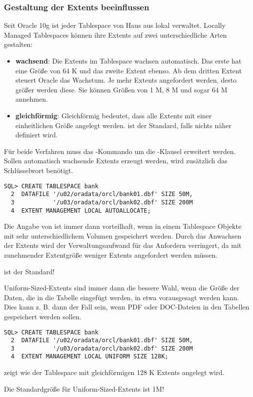         \subsubsection{Gestaltung der Extents beeinflussen}
          Seit Oracle 10g ist jeder Tablespace von Haus aus lokal verwaltet. Locally Managed Tablespaces können ihre Extents auf zwei unterschiedliche Arten gestalten:
          \begin{itemize}
            \item \textbf{wachsend}: Die Extents im Tablespace wachsen automatisch. Das erste hat eine Größe von 64 K und das zweite Extent ebenso. Ab dem dritten Extent steuert Oracle das Wachstum. Je mehr Extents angefordert werden, desto größer werden diese. Sie können Größen von 1 M, 8 M und sogar 64 M annehmen.
            \item \textbf{gleichförmig}: Gleichförmig bedeutet, dass alle Extents mit einer einheitlichen Größe angelegt werden.  ist der Standard, falls nichts näher definiert wird.
          \end{itemize}
          Für beide Verfahren muss das -Kommando um die -Klausel erweitert werden. Sollen automatisch wachsende Extents erzeugt werden, wird zusätzlich das Schlüsselwort  benötigt.
          \begin{lstlisting}[caption={Ein Tablespace mit automatisch wachsenden Extents},label=admin105,language=oracle_sql]
SQL> CREATE TABLESPACE bank
  2  DATAFILE '/u02/oradata/orcl/bank01.dbf' SIZE 50M,
  3           '/u03/oradata/orcl/bank02.dbf' SIZE 200M
  4  EXTENT MANAGEMENT LOCAL AUTOALLOCATE;
          \end{lstlisting}
          Die Angabe von  ist immer dann vorteilhaft, wenn in einem Tablespace Objekte mit sehr unterschiedlichem Volumen gespeichert werden. Durch das Anwachsen der Extents wird der Verwaltungsaufwand für das Anfordern verringert, da mit zunehmender Extentgröße weniger Extents angefordert werden müssen.
          \begin{merke}
             ist der Standard!
          \end{merke}
          Uniform-Sized-Extents sind immer dann die bessere Wahl, wenn die Größe der Daten, die in die Tabelle eingefügt werden, in etwa vorausgesagt werden kann. Dies kann z. B. dann der Fall sein, wenn PDF oder DOC-Dateien in den Tabellen gespeichert werden sollen.
          \begin{lstlisting}[caption={Uniform-Sized-Extents},label=admin106,language=oracle_sql]
SQL> CREATE TABLESPACE bank
  2  DATAFILE '/u02/oradata/orcl/bank01.dbf' SIZE 50M,
  3           '/u03/oradata/orcl/bank02.dbf' SIZE 200M
  4  EXTENT MANAGEMENT LOCAL UNIFORM SIZE 128K;
          \end{lstlisting}
           zeigt wie der Tablespace  mit gleichförmigen 128 K Extents angelegt wird.
          \begin{merke}
            Die Standardgröße für Uniform-Sized-Extents ist 1M!
          \end{merke}
